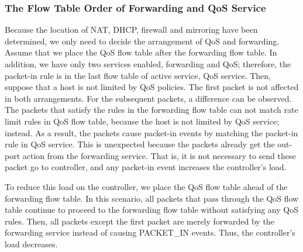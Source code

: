 \subsubsection{The Flow Table Order of Forwarding and QoS Service}
Because the location of NAT, DHCP, firewall and mirroring have been determined, we only need to decide the arrangement of QoS and forwarding. Assume that we place the QoS flow table after the forwarding flow table. In addition, we have only two services enabled, forwarding and QoS; therefore, the packet-in rule is in the last flow table of active service, QoS service. Then, suppose that a host is not limited by QoS policies. The first packet is not affected in both arrangements. For the subsequent packets, a difference can be observed. The packets that satisfy the rules in the forwarding flow table can not match rate limit rules in QoS flow table, because the host is not limited by QoS service; instead. As a result, the packets cause packet-in events by matching the packet-in rule in QoS service. This is unexpected because the packets already get the out-port action from the forwarding service. That is, it is not necessary to send these packet go to controller, and any packet-in event increases the controller’s load.

To reduce this load on the controller, we place the QoS flow table ahead of the forwarding flow table. In this scenario, all packets that pass through the QoS flow table continue to proceed to the forwarding flow table without satisfying any QoS rules. Then, all packets except the first packet are merely forwarded by the forwarding service instead of causing PACKET\_IN events. Thus, the controller’s load decreases.
